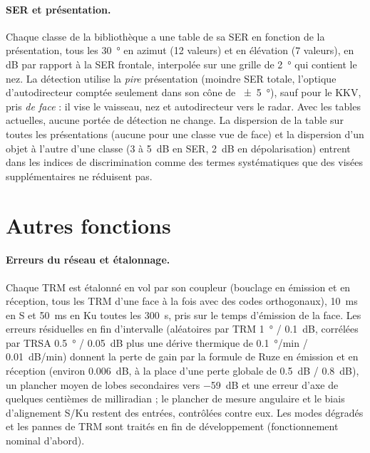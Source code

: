 \documentclass[11pt,a4paper]{article}
\begin{document}
\paragraph{SER et présentation.} Chaque classe de la bibliothèque a une table de sa SER en fonction de la présentation,
tous les \SI{30}{\degree} en azimut (12 valeurs) et en élévation (7 valeurs), en dB par rapport à la SER frontale,
interpolée sur une grille de \SI{2}{\degree} qui contient le nez. La détection utilise la \emph{pire} présentation
(moindre SER totale, l'optique d'autodirecteur comptée seulement dans son cône de \SI{\pm5}{\degree}), sauf pour le KKV,
pris \emph{de face} : il vise le vaisseau, nez et autodirecteur vers le radar. Avec les tables actuelles, aucune portée
de détection ne change. La dispersion de la table sur toutes les présentations (aucune pour une classe vue de face) et
la dispersion d'un objet à l'autre d'une classe (3 à \SI{5}{dB} en SER, \SI{2}{dB} en dépolarisation) entrent dans les
indices de discrimination comme des termes systématiques que des visées supplémentaires ne réduisent pas.

\section{Autres fonctions}
\paragraph{Erreurs du réseau et étalonnage.}\label{sec:cal} Chaque TRM est étalonné en vol par son coupleur (bouclage en
émission et en réception, tous les TRM d'une face à la fois avec des codes orthogonaux), \SI{10}{ms} en S et
\SI{50}{ms} en Ku toutes les \SI{300}{s}, pris sur le temps d'émission de la face. Les erreurs résiduelles en fin
d'intervalle (aléatoires par TRM \SI{1}{\degree} / \SI{0.1}{dB}, corrélées par TRSA \SI{0.5}{\degree} / \SI{0.05}{dB}
plus une dérive thermique de \SI{0.1}{\degree/min} / \SI{0.01}{dB/min}) donnent la perte de gain par la formule de Ruze
en émission et en réception (environ \SI{0.006}{dB}, à la place d'une perte globale de \SI{0.5}{dB} / \SI{0.8}{dB}), un
plancher moyen de lobes secondaires vers \SI{-59}{dB} et une erreur d'axe de quelques centièmes de milliradian ; le
plancher de mesure angulaire et le biais d'alignement S/Ku restent des entrées, contrôlées contre eux. Les modes
dégradés et les pannes de TRM sont traités en fin de développement (fonctionnement nominal d'abord).
\end{document}
